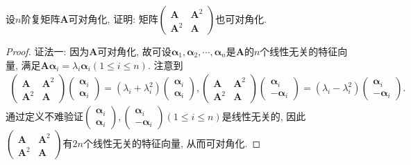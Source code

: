 \documentclass[../../main.tex]{subfiles}
\begin{document}
\begin{example}
设\(n\)阶复矩阵\(\boldsymbol{A}\)可对角化, 证明: 矩阵\(\begin{pmatrix}
\boldsymbol{A}&\boldsymbol{A}^{2}\\
\boldsymbol{A}^{2}&\boldsymbol{A}
\end{pmatrix}\)也可对角化.
\end{example}
\begin{proof}
{\color{blue}证法一:}
因为\(\boldsymbol{A}\)可对角化, 故可设\(\boldsymbol{\alpha}_{1},\boldsymbol{\alpha}_{2},\cdots,\boldsymbol{\alpha}_{n}\)是\(\boldsymbol{A}\)的\(n\)个线性无关的特征向量, 满足\(\boldsymbol{A}\boldsymbol{\alpha}_{i}=\lambda_{i}\boldsymbol{\alpha}_{i}(1\leq i\leq n)\). 注意到
\begin{align*}
\begin{pmatrix}
\boldsymbol{A}&\boldsymbol{A}^{2}\\
\boldsymbol{A}^{2}&\boldsymbol{A}
\end{pmatrix}\begin{pmatrix}
\boldsymbol{\alpha}_{i}\\
\boldsymbol{\alpha}_{i}
\end{pmatrix}=(\lambda_{i}+\lambda_{i}^{2})\begin{pmatrix}
\boldsymbol{\alpha}_{i}\\
\boldsymbol{\alpha}_{i}
\end{pmatrix}, \begin{pmatrix}
\boldsymbol{A}&\boldsymbol{A}^{2}\\
\boldsymbol{A}^{2}&\boldsymbol{A}
\end{pmatrix}\begin{pmatrix}
\boldsymbol{\alpha}_{i}\\
-\boldsymbol{\alpha}_{i}
\end{pmatrix}=(\lambda_{i}-\lambda_{i}^{2})\begin{pmatrix}
\boldsymbol{\alpha}_{i}\\
-\boldsymbol{\alpha}_{i}
\end{pmatrix}.
\end{align*}
通过定义不难验证\(\begin{pmatrix}
\boldsymbol{\alpha}_{i}\\
\boldsymbol{\alpha}_{i}
\end{pmatrix},\begin{pmatrix}
\boldsymbol{\alpha}_{i}\\
-\boldsymbol{\alpha}_{i}
\end{pmatrix}(1\leq i\leq n)\)是线性无关的, 因此\(\begin{pmatrix}
\boldsymbol{A}&\boldsymbol{A}^{2}\\
\boldsymbol{A}^{2}&\boldsymbol{A}
\end{pmatrix}\)有\(2n\)个线性无关的特征向量, 从而可对角化. 


\end{proof}
\end{document}
